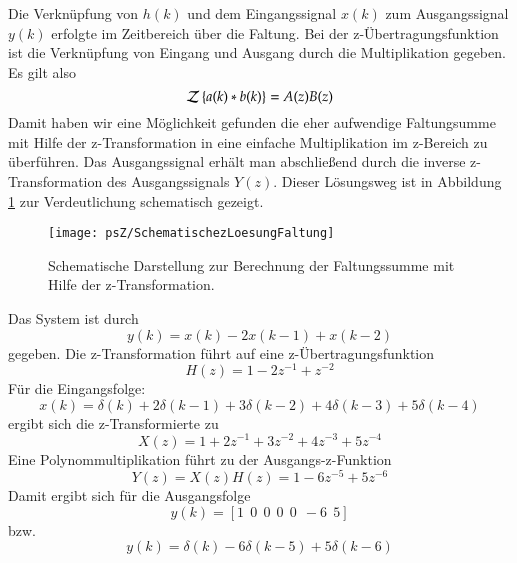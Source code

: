 Die Verknüpfung von $h(k)$ und dem Eingangssignal $x(k)$ zum
Ausgangssignal $y(k)$ erfolgte im Zeitbereich über die Faltung.
Bei der z-Übertragungsfunktion ist die Verknüpfung von Eingang und
Ausgang durch die Multiplikation gegeben. Es gilt also
\begin{equation}\label{eq:zTrafo:FaltungMulti}
    {\cal Z}\left\{a(k)\ast b(k)\right\} = A(z) B(z)
\end{equation}
Damit haben wir eine Möglichkeit gefunden die eher aufwendige
Faltungsumme mit Hilfe der z-Transformation in eine einfache
Multiplikation im z-Bereich zu überführen. Das Ausgangssignal
erhält man abschließend durch die inverse z-Transformation des
Ausgangssignals $Y(z)$. Dieser Lösungsweg ist in Abbildung \ref{pic:SchemaZLoesungFaltung}
zur Verdeutlichung schematisch gezeigt.

\begin{figure}[H]
\begin{center}
\texttt{[image: psZ/SchematischezLoesungFaltung]}
\caption{\label{pic:SchemaZLoesungFaltung} Schematische Darstellung zur Berechnung
der Faltungssumme mit Hilfe der z-Transformation.}
\end{center}
\end{figure}

\begin{example}
Das System ist durch
\[
    y(k) = x(k) -2x(k-1) + x(k-2)
\]
gegeben. Die z-Transformation führt auf eine z-Übertragungsfunktion
\[
    H(z) = 1-2z^{-1} + z^{-2}
\]
Für die Eingangsfolge:
\[
    x(k) = \delta(k) + 2\delta(k-1)  + 3\delta(k-2)  + 4\delta(k-3)  + 5\delta(k-4)
\]
ergibt sich die z-Transformierte zu
\[
X(z) = 1 + 2z^{-1} + 3z^{-2}+ 4z^{-3}+ 5z^{-4}
\]
Eine Polynommultiplikation führt zu der Ausgangs-z-Funktion
\[
Y(z) = X(z)H(z) = 1 -6 z^{-5} + 5 z^{-6}
\]
Damit ergibt sich für die Ausgangsfolge
\[
    y(k) = [1 \:\: 0 \:\: 0 \:\: 0 \:\: 0 \:\: -6 \:\: 5]
\]
bzw.
\[
    y(k) = \delta(k) - 6 \delta(k-5) + 5 \delta(k-6)
\]
\end{example}


